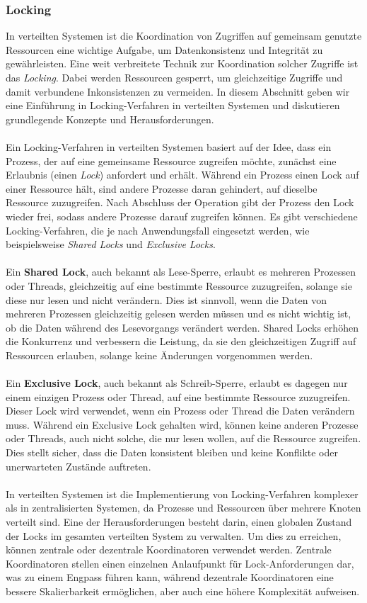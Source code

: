 \documentclass[../vs-script-first-v01.tex]{subfiles}
\begin{document}
\subsubsection{Locking}
In verteilten Systemen ist die Koordination von Zugriffen auf gemeinsam genutzte Ressourcen eine wichtige Aufgabe, um Datenkonsistenz und Integrität zu gewährleisten. Eine weit verbreitete Technik zur Koordination solcher Zugriffe ist das \textit{Locking}. Dabei werden Ressourcen gesperrt, um gleichzeitige Zugriffe und damit verbundene Inkonsistenzen zu vermeiden. In diesem Abschnitt geben wir eine Einführung in Locking-Verfahren in verteilten Systemen und diskutieren grundlegende Konzepte und Herausforderungen.
\\\\
Ein Locking-Verfahren in verteilten Systemen basiert auf der Idee, dass ein Prozess, der auf eine gemeinsame Ressource zugreifen möchte, zunächst eine Erlaubnis (einen \textit{Lock}) anfordert und erhält. Während ein Prozess einen Lock auf einer Ressource hält, sind andere Prozesse daran gehindert, auf dieselbe Ressource zuzugreifen. Nach Abschluss der Operation gibt der Prozess den Lock wieder frei, sodass andere Prozesse darauf zugreifen können. Es gibt verschiedene Locking-Verfahren, die je nach Anwendungsfall eingesetzt werden, wie beispielsweise \textit{Shared Locks} und \textit{Exclusive Locks}.
\\\\
Ein \textbf{Shared Lock}, auch bekannt als Lese-Sperre, erlaubt es mehreren Prozessen oder Threads, gleichzeitig auf eine bestimmte Ressource zuzugreifen, solange sie diese nur lesen und nicht verändern. Dies ist sinnvoll, wenn die Daten von mehreren Prozessen gleichzeitig gelesen werden müssen und es nicht wichtig ist, ob die Daten während des Lesevorgangs verändert werden. Shared Locks erhöhen die Konkurrenz und verbessern die Leistung, da sie den gleichzeitigen Zugriff auf Ressourcen erlauben, solange keine Änderungen vorgenommen werden.
\\\\
Ein \textbf{Exclusive Lock}, auch bekannt als Schreib-Sperre, erlaubt es dagegen nur einem einzigen Prozess oder Thread, auf eine bestimmte Ressource zuzugreifen. Dieser Lock wird verwendet, wenn ein Prozess oder Thread die Daten verändern muss. Während ein Exclusive Lock gehalten wird, können keine anderen Prozesse oder Threads, auch nicht solche, die nur lesen wollen, auf die Ressource zugreifen. Dies stellt sicher, dass die Daten konsistent bleiben und keine Konflikte oder unerwarteten Zustände auftreten.
\\\\
In verteilten Systemen ist die Implementierung von Locking-Verfahren komplexer als in zentralisierten Systemen, da Prozesse und Ressourcen über mehrere Knoten verteilt sind. Eine der Herausforderungen besteht darin, einen globalen Zustand der Locks im gesamten verteilten System zu verwalten. Um dies zu erreichen, können zentrale oder dezentrale Koordinatoren verwendet werden. Zentrale Koordinatoren stellen einen einzelnen Anlaufpunkt für Lock-Anforderungen dar, was zu einem Engpass führen kann, während dezentrale Koordinatoren eine bessere Skalierbarkeit ermöglichen, aber auch eine höhere Komplexität aufweisen.
\end{document}
